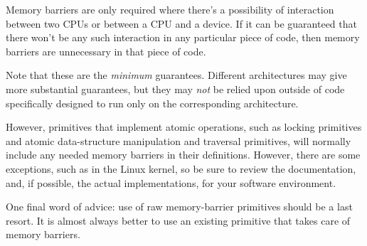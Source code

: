 Memory barriers are only required where there's a possibility of interaction
between two CPUs or between a CPU and a device.  If it can be guaranteed that
there won't be any such interaction in any particular piece of code, then
memory barriers are unnecessary in that piece of code.

Note that these are the \emph{minimum} guarantees.
Different architectures may give
more substantial guarantees,
but they may \emph{not}
be relied upon outside of code specifically designed to run only on
the corresponding architecture.

However, primitives that implement atomic operations, such as locking
primitives and atomic data-structure manipulation and traversal primitives,
will normally include any needed memory barriers in their definitions.
However, there are some exceptions, such as  in the
Linux kernel, so be sure to review the documentation, and, if possible,
the actual implementations, for your software environment.

One final word of advice: use of raw memory-barrier primitives should
be a last resort.
It is almost always better to use an existing primitive that takes
care of memory barriers.
